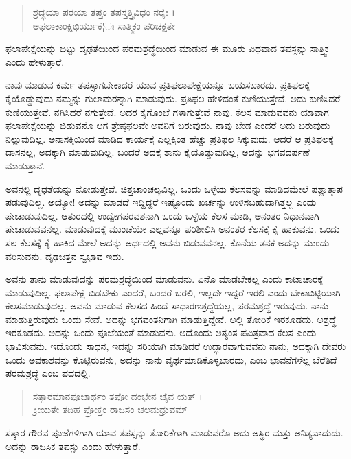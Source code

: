 \begin{verse}
ಶ್ರದ್ಧಯಾ ಪರಯಾ ತಪ್ತಂ ತಪಸ್ತತ್ತ್ರಿವಿಧಂ ನರೈಃ ।\\ಅಫಲಾಕಾಂಕ್ಷಿಭಿರ್ಯುಕೆ¦ಃ ಸಾತ್ತ್ವಿಕಂ ಪರಿಚಕ್ಷತೇ 
\end{verse}

{\small ಫಲಾಪೇಕ್ಷೆಯನ್ನು ಬಿಟ್ಟು ದೃಢತೆಯಿಂದ ಪರಮಶ್ರದ್ಧೆಯಿಂದ ಮಾಡುವ ಈ ಮೂರು ವಿಧವಾದ ತಪಸ್ಸನ್ನು ಸಾತ್ತ್ವಿಕ ಎಂದು ಹೇಳುತ್ತಾರೆ.}

ನಾವು ಮಾಡುವ ಕರ್ಮ ತಪಸ್ಸಾಗಬೇಕಾದರೆ ಯಾವ ಪ್ರತಿಫಲಾಪೇಕ್ಷೆಯನ್ನೂ ಬಯಸಬಾರದು. ಪ್ರತಿಫಲಕ್ಕೆ ಕೈಯೊಡ್ಡುವುದು ನಮ್ಮನ್ನು ಗುಲಾಮರನ್ನಾಗಿ ಮಾಡುವುದು. ಪ್ರತಿಫಲ ಹೇಳಿದಂತೆ ಕುಣಿಯುತ್ತೇವೆ. ಅದು ಕುಣಿಸಿದರೆ ಕುಣಿಯುತ್ತೇವೆ. ನಗಿಸಿದರೆ ನಗುತ್ತೇವೆ. ಅದರ ಕೈಗೊಂಬೆ ಗಳಾಗುತ್ತೇವೆ ನಾವು. ಕೆಲಸ ಮಾಡುವವನು ಯಾವಾಗ ಫಲಾಪೇಕ್ಷೆಯನ್ನು ಬಿಡುವನೊ ಆಗ ಶ್ರೇಷ್ಠಫಲವೇ ಅವನಿಗೆ ಬರುವುದು. ನಾವು ಬೇಡ ಎಂದರೆ ಅದು ಬರುವುದು ನಿಲ್ಲುವುದಿಲ್ಲ. ಅನಾಸಕ್ತಿಯಿಂದ ಮಾಡಿದ ಕಾರ್ಯಕ್ಕೆ ಎಲ್ಲಕ್ಕಿಂತ ಹೆಚ್ಚು ಪ್ರತಿಫಲ ಸಿಕ್ಕುವುದು. ಆದರೆ ಆ ಪ್ರತಿಫಲಕ್ಕೆ ದಾಸನಲ್ಲ, ಅದಕ್ಕಾಗಿ ಮಾಡುವುದಿಲ್ಲ. ಬಂದರೆ ಅದಕ್ಕೆ ತಾನು ಕೈಯೊಡ್ಡುವುದಿಲ್ಲ, ಅದನ್ನು ಭಗವದರ್ಪಣೆ ಮಾಡುತ್ತಾನೆ.

ಅವನಲ್ಲಿ ದೃಢತೆಯನ್ನು ನೋಡುತ್ತೇವೆ. ಚಿತ್ತಚಾಂಚಲ್ಯವಿಲ್ಲ. ಒಂದು ಒಳ್ಳೆಯ ಕೆಲಸವನ್ನು ಮಾಡಿದಮೇಲೆ ಪಶ್ಚಾತ್ತಾಪ ಪಡುವುದಿಲ್ಲ. ಅಯ್ಯೋ! ಅದನ್ನು ಮಾಡದೆ ಇದ್ದಿದ್ದರೆ ಇಷ್ಟೊಂದು ಖರ್ಚನ್ನು ಉಳಿಸಬಹುದಾಗಿತ್ತಲ್ಲ ಎಂದು ಪೇಚಾಡುವುದಿಲ್ಲ. ಆತುರದಲ್ಲಿ ಉದ್ವೇಗಪರವಶನಾಗಿ ಒಂದು ಒಳ್ಳೆಯ ಕೆಲಸ ಮಾಡಿ, ಅನಂತರ ನಿಧಾನವಾಗಿ ಪೇಚಾಡುವವನಲ್ಲ. ಮಾಡುವುದಕ್ಕೆ ಮುಂಚೆಯೇ ಎಲ್ಲವನ್ನೂ ಪರಿಶೀಲಿಸಿ ಅನಂತರ ಕೆಲಸಕ್ಕೆ ಕೈ ಹಾಕುವನು. ಒಂದು ಸಲ ಕೆಲಸಕ್ಕೆ ಕೈ ಹಾಕಿದ ಮೇಲೆ ಅದನ್ನು ಅರ್ಧದಲ್ಲಿ ಅವನು ಬಿಡುವವನಲ್ಲ. ಕೊನೆಯ ತನಕ ಅದನ್ನು ಮುಂದು ವರಿಸುವನು. ದೃಢಚಿತ್ತನ ಸ್ವಭಾವ ಇದು.

ಅವನು ತಾನು ಮಾಡುವುದನ್ನು ಪರಮಶ್ರದ್ಧೆಯಿಂದ ಮಾಡುವನು. ಏನೊ ಮಾಡಬೇಕಲ್ಲ ಎಂದು ಕಾಟಾಚಾರಕ್ಕೆ ಮಾಡುವುದಿಲ್ಲ. ಫಲಾಪೇಕ್ಷೆ ಬಿಡಬೇಕು ಎಂದರೆ, ಬಂದರೆ ಬರಲಿ, ಇಲ್ಲದೇ ಇದ್ದರೆ ಇರಲಿ ಎಂದು ಬೇಕಾಬಿಟ್ಟಿಯಾಗಿ ಕೆಲಸಮಾಡುವುದಲ್ಲ. ಅವನು ಮಾಡುವ ಕೆಲಸದ ಹಿಂದೆ ಸಾಧಾರಣಶ್ರದ್ಧೆಯಲ್ಲ, ಪರಮಶ್ರದ್ಧೆ ಇರುವುದು. ನಾನು ಮಾಡುತ್ತಿರುವುದು ಒಂದು ಸೇವೆ. ಅದನ್ನು ಭಗವಂತನಿಗಾಗಿ ಮಾಡುತ್ತಿದ್ದೇನೆ. ಅಲ್ಲಿ ತೋರಿಕೆ ಇರಕೂಡದು, ಅಶ್ರದ್ಧೆ ಇರಕೂಡದು. ಅದನ್ನು ಒಂದು ಪೂಜೆಯಂತೆ ಮಾಡುವನು. ಅದೊಂದು ಅತ್ಯಂತ ಪವಿತ್ರವಾದ ಕೆಲಸ ಎಂದು ಭಾವಿಸುವನು. ಇದೊಂದು ಸಾಧನ, ಇದನ್ನು ಸರಿಯಾಗಿ ಮಾಡಿದರೆ ಉದ್ಧಾರವಾಗುವವನು ನಾನು, ಅದಕ್ಕಾಗಿ ದೇವರು ಒಂದು ಅವಕಾಶವನ್ನು ಕೊಟ್ಟಿರುವನು, ಅದನ್ನು ನಾನು ವ್ಯರ್ಥಮಾಡಿಕೊಳ್ಳಬಾರದು, ಎಂಬ ಭಾವನೆಗಳೆಲ್ಲ ಬೆರೆತಿದೆ ಪರಮಶ್ರದ್ಧೆ ಎಂಬ ಪದದಲ್ಲಿ.

\begin{verse}
ಸತ್ಕಾರಮಾನಪೂಜಾರ್ಥಂ ತಪೋ ದಂಭೇನ ಚೈವ ಯತ್ ।\\ಕ್ರೀಯತೇ ತದಿಹ ಪ್ರೋಕ್ತಂ ರಾಜಸಂ ಚಲಮಧ್ರುವಮ್ 
\end{verse}

{\small ಸತ್ಕಾರ ಗೌರವ ಪೂಜೆಗಳಿಗಾಗಿ ಯಾವ ತಪಸ್ಸನ್ನು ತೋರಿಕೆಗಾಗಿ ಮಾಡುವರೊ ಅದು ಅಸ್ಥಿರ ಮತ್ತು ಅನಿತ್ಯವಾದುದು. ಅದನ್ನು ರಾಜಸಿಕ ತಪಸ್ಸು ಎಂದು ಹೇಳುತ್ತಾರೆ.}

